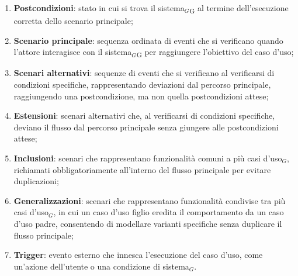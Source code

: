 \documentclass[a4paper, 10pt]{article}
\begin{document}
\begin{enumerate}
    \item \textbf{Postcondizioni}: stato in cui si trova il sistema$_G$\textsubscript{G} al termine dell'esecuzione corretta dello scenario principale;
    \item \textbf{Scenario principale}: sequenza ordinata di eventi che si verificano quando l'attore interagisce con il sistema$_G$\textsubscript{G} per raggiungere l'obiettivo del caso d'uso;
    \item \textbf{Scenari alternativi}: sequenze di eventi che si verificano al verificarsi di condizioni specifiche, rappresentando deviazioni dal percorso principale, raggiungendo una postcondizione, ma non quella postcondizioni attese;
    \item \textbf{Estensioni}: scenari alternativi che, al verificarsi di condizioni specifiche, deviano il flusso dal percorso principale senza giungere alle postcondizioni attese;
    \item \textbf{Inclusioni}: scenari che rappresentano funzionalità comuni a più casi d'uso$_G$, richiamati obbligatoriamente all'interno del flusso principale per evitare duplicazioni;
    \item \textbf{Generalizzazioni}: scenari che rappresentano funzionalità condivise tra più casi d'uso$_G$, in cui un caso d'uso figlio eredita il comportamento da un caso d'uso padre, consentendo di modellare varianti specifiche senza duplicare il flusso principale;
    \item \textbf{Trigger}: evento esterno che innesca l'esecuzione del caso d'uso, come un'azione dell'utente o una condizione di sistema$_G$.
\end{enumerate}
\end{document}
